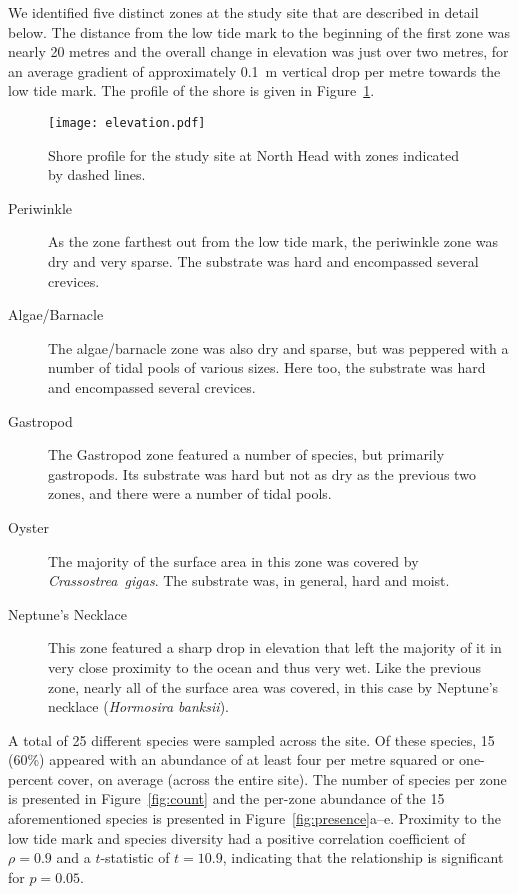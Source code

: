 \documentclass[11pt]{article}
\begin{document}
		We identified five distinct zones at the study site that are described in detail below. The distance from the low tide mark to the beginning of the first zone was nearly 20 metres and the overall change in elevation was just over two metres, for an average gradient of approximately \SI{0.1}{m} vertical drop per metre towards the low tide mark. The profile of the shore is given in Figure~\ref{fig:elevation}.
		
	\begin{figure}
		\texttt{[image: elevation.pdf]}
		\caption{Shore profile for the study site at North Head with zones indicated by dashed lines.}
		\label{fig:elevation}
	\end{figure}
		
	\begin{description}
		
		\item[Periwinkle] As the zone farthest out from the low tide mark, the periwinkle zone was dry and very sparse. The substrate was hard and encompassed several crevices.
		
		\item[Algae/Barnacle] The algae/barnacle zone was also dry and sparse, but was peppered with a number of tidal pools of various sizes. Here too, the substrate was hard and encompassed several crevices.
		
		\item[Gastropod] The Gastropod zone featured a number of species, but primarily gastropods. Its substrate was hard but not as dry as the previous two zones, and there were a number of tidal pools.
		
		\item[Oyster] The majority of the surface area in this zone was covered by \emph{Crassostrea~gigas}. The substrate was, in general, hard and moist.
		
		\item[Neptune's Necklace] This zone featured a sharp drop in elevation that left the majority of it in very close proximity to the ocean and thus very wet. Like the previous zone, nearly all of the surface area was covered, in this case by Neptune's necklace (\emph{Hormosira banksii}).
		
	\end{description}
	
		A total of 25 different species were sampled across the site. Of these species, 15 (60\%) appeared with an abundance of at least four per metre squared or one-percent cover, on average (across the entire site). The number of species per zone is presented in Figure~\ref{fig:count} and the per-zone abundance of the 15 aforementioned species is presented in Figure~\ref{fig:presence}a--e. Proximity to the low tide mark and species diversity had a positive correlation coefficient of $\rho = 0.9$ and a $t$-statistic of $t=10.9$, indicating that the relationship is significant for $p=0.05$.
	
\end{document}
